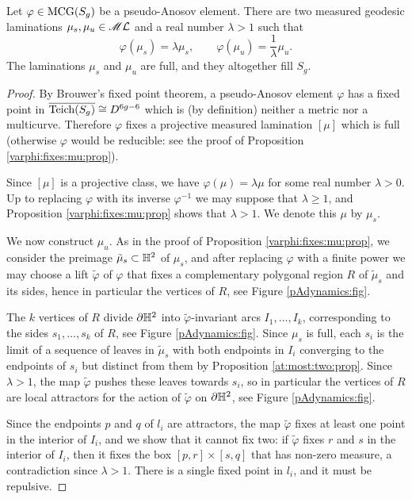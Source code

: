 \begin{teo} \label{su:teo}
Let $\varphi \in {\rm MCG}(S_g)$ be a pseudo-Anosov element. There are two measured geodesic laminations $\mu_s, \mu_u \in \mathscr{M}\mathcal{L}$ and a real number $\lambda >1$ such that 
$$\varphi(\mu_s) = \lambda \mu_s, \qquad \varphi(\mu_u) = \frac 1\lambda \mu_u.$$
The laminations $\mu_s$ and $\mu_u$ are full, and they altogether fill $S_g$. %
\end{teo}
\begin{proof}
By Brouwer's fixed point theorem, a pseudo-Anosov element $\varphi$ has a fixed point in $\overline{{\rm Teich}(S_g)}\cong D^{6g-6}$ which is (by definition) neither a metric nor a multicurve. Therefore $\varphi$ fixes a projective measured lamination $[\mu]$ which is full (otherwise $\varphi$ would be reducible: see the proof of Proposition \ref{varphi:fixes:mu:prop}).

Since $[\mu]$ is a projective class, we have $\varphi(\mu) = \lambda\mu$ for some real number $\lambda >0$. Up to replacing $\varphi$ with its inverse $\varphi^{-1}$ we may suppose that $\lambda \geqslant 1$, and Proposition \ref{varphi:fixes:mu:prop} shows that $\lambda>1$. We denote this $\mu$ by $\mu_s$.

We now construct $\mu_u$. As in the proof of Proposition \ref{varphi:fixes:mu:prop}, we consider the preimage $\tilde\mu_s\subset \mathbb{H}^2$ of $\mu_s$, and after replacing $\varphi$ with a finite power we may choose a lift $\tilde \varphi$ of $\varphi$ that fixes a complementary polygonal region $R$ of $\tilde\mu_s$ and its sides, hence in particular the vertices of $R$, see Figure \ref{pAdynamics:fig}.

The $k$ vertices of $R$ divide $\partial \mathbb{H}^2$ into $\tilde\varphi$-invariant arcs $I_1,\ldots, I_k$, corresponding to the sides $s_1,\ldots, s_k$ of $R$, see Figure \ref{pAdynamics:fig}. Since $\mu_s$ is full, each $s_i$ is the limit of a sequence of leaves in $\tilde\mu_s$ with both endpoints in $I_i$ converging to the endpoints of $s_i$ but distinct from them by Proposition \ref{at:most:two:prop}. Since $\lambda > 1$, the map $\tilde\varphi$ pushes these leaves towards $s_i$, so in particular the vertices of $R$ are local attractors for the action of $\tilde\varphi$ on $\partial \mathbb{H}^2$, see Figure \ref{pAdynamics:fig}.

Since the endpoints $p$ and $q$ of $l_i$ are attractors, the map $\tilde\varphi$ fixes at least one point in the interior of $I_i$, and we show that it cannot fix two: if $\tilde \varphi$ fixes $r$ and $s$ in the interior of $I_i$, then it fixes the box $[p,r] \times [s,q]$ that has non-zero measure, a contradiction since $\lambda > 1$. There is a single fixed point in $l_i$, and it must be repulsive.


\end{proof}
